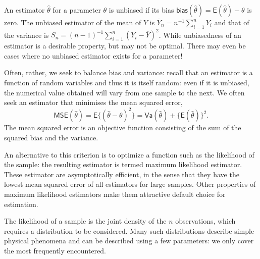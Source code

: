\documentclass[
  11pt,
  letterpaper,
]{book}
\theoremstyle{definition}
\theoremstyle{definition}
\theoremstyle{definition}
\theoremstyle{remark}
\begin{document}
An estimator \(\hat{\theta}\) for a parameter \(\theta\) is unbiased if its bias \(\mathsf{bias}(\hat{\theta})=\mathsf{E}(\hat{\theta})- \theta\) is zero.
The unbiased estimator of the mean of \(Y\) is \(\overline{Y}_n = n^{-1} \sum_{i=1}^n Y_i\) and that of the variance is \(S_n = (n-1)^{-1} \sum_{i=1}^n (Y_i-\overline{Y})^2\). While unbiasedness of an estimator is a desirable property, but may not be optimal. There may even be cases where no unbiased estimator exists for a parameter!

Often, rather, we seek to balance bias and variance: recall that an estimator is a function of random variables and thus it is itself random: even if it is unbiased, the numerical value obtained will vary from one sample to the next. We often seek an estimator that minimises the mean squared error, \[\mathsf{MSE}(\hat{\theta}) = \mathsf{E}\{(\hat{\theta}-\theta)^2\}=\mathsf{Va}(\hat{\theta}) + \{\mathsf{E}(\hat{\theta})\}^2.\]
The mean squared error is an objective function consisting of the sum of the squared bias and the variance.

An alternative to this criterion is to optimize a function such as the likelihood of the sample: the resulting estimator is termed maximum likelihood estimator. These estimator are asymptotically efficient, in the sense that they have the lowest mean squared error of all estimators for large samples. Other properties of maximum likelihood estimators make them attractive default choice for estimation.

The likelihood of a sample is the joint density of the \(n\) observations, which requires a distribution to be considered. Many such distributions describe simple physical phenomena and can be described using a few parameters: we only cover the most frequently encountered.
\end{document}
